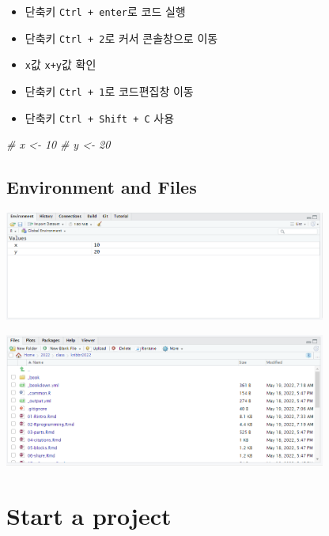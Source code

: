 \documentclass[
]{book}
\newenvironment{Shaded}{\begin{snugshade}}{\end{snugshade}}
\newcommand{\CommentTok}[1]{\textcolor[rgb]{0.56,0.35,0.01}{\textit{#1}}}
\providecommand{\tightlist}{%
  \setlength{\itemsep}{0pt}\setlength{\parskip}{0pt}}
\begin{document}
\begin{itemize}
\tightlist
\item
  단축키 \texttt{Ctrl\ +\ enter}로 코드 실행
\item
  단축키 \texttt{Ctrl\ +\ 2}로 커서 콘솔창으로 이동
\item
  \texttt{x}값 \texttt{x+y}값 확인
\item
  단축키 \texttt{Ctrl\ +\ 1}로 코드편집창 이동
\item
  단축키 \texttt{Ctrl\ +\ Shift\ +\ C} 사용
\end{itemize}

\begin{Shaded}
\begin{Highlighting}[]
\CommentTok{\# x \textless{}{-} 10}
\CommentTok{\# y \textless{}{-} 20}
\end{Highlighting}
\end{Shaded}

\hypertarget{environment-and-files}{%
\subsection{Environment and Files}\label{environment-and-files}}

\includegraphics[width=4.16667in,height=\textheight]{images/01/envandhist.png}

\includegraphics[width=4.16667in,height=\textheight]{images/01/fileandpackages.png}

\hypertarget{start-a-project}{%
\section{Start a project}\label{start-a-project}}
\end{document}
